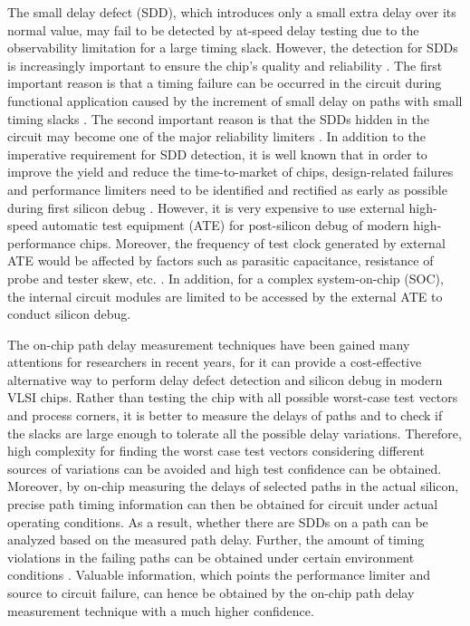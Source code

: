 The small delay defect (SDD), which introduces only a small extra delay over its normal value, may fail to be detected by at-speed delay testing due to the observability limitation for a large timing slack. However, the detection for SDDs is increasingly important to ensure the chip’s quality and reliability \cite{menon2009output} \cite{ahmed2006novel}. The first important reason is that a timing failure can be occurred in the circuit during functional application caused by the increment of small delay on paths with small timing slacks \cite{kruseman2004hazard}. The second important reason is that the SDDs hidden in the circuit may become one of the major reliability limiters \cite{nigh2000test} \cite{tayade2008small}. In addition to the imperative requirement for SDD detection, it is well known that in order to improve the yield and reduce the time-to-market of chips, design-related failures and performance limiters need to be identified and rectified as early as possible during first silicon debug \cite{balachandran2002facilitating}. However, it is very expensive to use external high-speed automatic test equipment (ATE) for post-silicon debug of modern high-performance chips. Moreover, the frequency of test clock generated by external ATE would be affected by factors such as parasitic capacitance, resistance of probe and tester skew, etc. \cite{sunter1998bist}. In addition, for a complex system-on-chip (SOC), the internal circuit modules are limited to be accessed by the external ATE to conduct silicon debug.

The on-chip path delay measurement techniques have been gained many attentions for researchers in recent years, for it can provide a cost-effective alternative way to perform delay defect detection and silicon debug in modern VLSI chips. Rather than testing the chip with all possible worst-case test vectors and process corners, it is better to measure the delays of paths and to check if the slacks are large enough to tolerate all the possible delay variations. Therefore, high complexity for finding the worst case test vectors considering different sources of variations can be avoided and high test confidence can be obtained. Moreover, by on-chip measuring the delays of selected paths in the actual silicon, precise path timing information can then be obtained for circuit under actual operating conditions. As a result, whether there are SDDs on a path can be analyzed based on the measured path delay. Further, the amount of timing violations in the failing paths can be obtained under certain environment conditions \cite{datta2004delay} \cite{ datta2006scheme}. Valuable information, which points the performance limiter and source to circuit failure, can hence be obtained by the on-chip path delay measurement technique with a much higher confidence.

